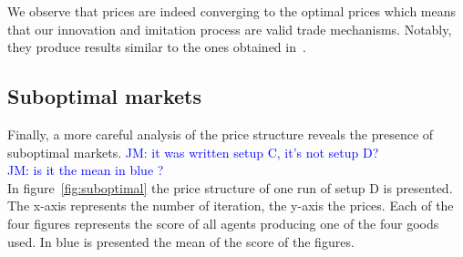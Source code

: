 \documentclass{wscpaperproc}
\newcommand{\memo}[2]{\textcolor{#1}{#2}}
\newcommand{\jm}[1]{\memo{blue}{JM: #1\\}}
\begin{document}
We observe that prices are indeed converging to the optimal prices which means that our innovation and imitation process are valid trade mechanisms. Notably, they produce results similar to the ones obtained in~.

\subsection{Suboptimal markets}

Finally, a more careful analysis of the price structure reveals the presence of suboptimal markets. 
\jm{it was written setup C, it's not setup D?}
\jm{is it the mean in blue ?}
In figure~\ref{fig:suboptimal} the price structure of one run of setup D is presented. The x-axis represents the number of iteration, the y-axis the prices. Each of the four figures represents the score of all agents producing one of the four goods used. In blue is presented the mean of the score of the figures.

\end{document}
